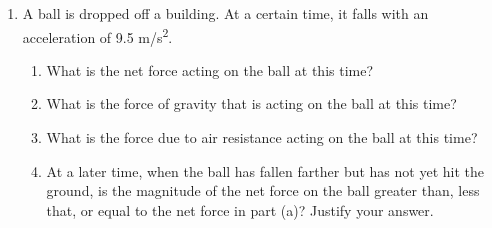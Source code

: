 \documentclass[letterpaper, 12pt]{article}
\begin{document}
\begin{enumerate}
\item A ball is dropped off a building.  At a certain time, it falls with an acceleration of 9.5 m/s\textsuperscript{2}. 
	\begin{enumerate}
		\item What is the net force acting on the ball at this time?
		\vspace{0.45in}		
		\item What is the force of gravity that is acting on the ball at this time?
		\vspace{0.45in}
		\item What is the force due to air resistance acting on the ball at this time?  
		\vspace{0.45in}
		\item At a later time, when the ball has fallen farther but has not yet hit the ground, is the magnitude of the net force on the ball greater than, less that, or equal to the net force in part (a)?  Justify your answer. 
		\end{enumerate}




\end{enumerate}


 
\end{document}
